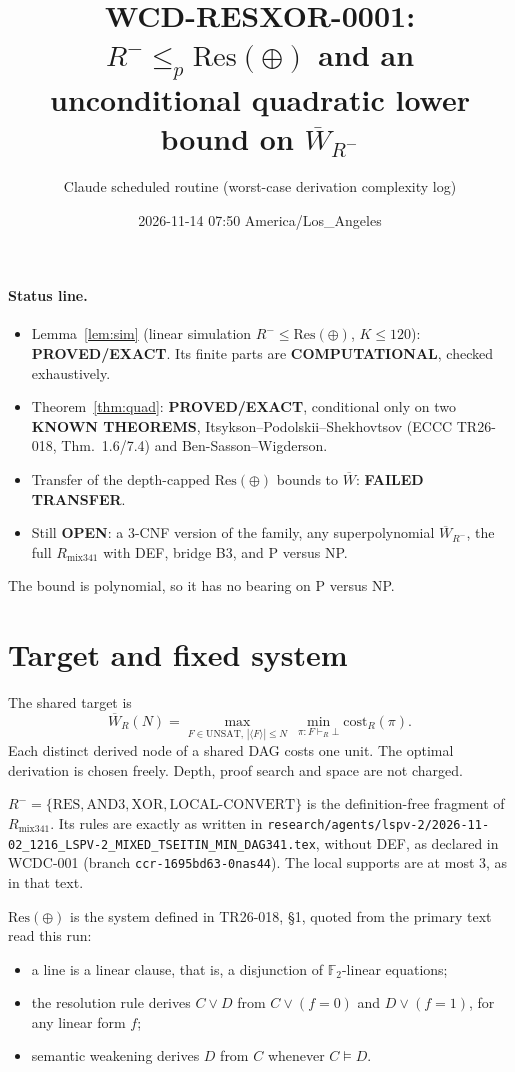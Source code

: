 \documentclass[11pt]{article}
\title{WCD-RESXOR-0001: $R^-\le_p\mathrm{Res}(\oplus)$ and an unconditional quadratic lower bound on $\overline W_{R^-}$}
\author{Claude scheduled routine (worst-case derivation complexity log)}
\date{2026-11-14 07:50 America/Los\_Angeles}
\begin{document}
\maketitle

\paragraph{Status line.}
\begin{itemize}
\item Lemma~\ref{lem:sim} (linear simulation $R^-\le\mathrm{Res}(\oplus)$, $K\le120$): \textbf{PROVED/EXACT}. Its finite parts are \textbf{COMPUTATIONAL}, checked exhaustively.
\item Theorem~\ref{thm:quad}: \textbf{PROVED/EXACT}, conditional only on two \textbf{KNOWN THEOREMS}, Itsykson--Podolskii--Shekhovtsov (ECCC TR26-018, Thm.~1.6/7.4) and Ben-Sasson--Wigderson.
\item Transfer of the depth-capped $\mathrm{Res}(\oplus)$ bounds to $\overline W$: \textbf{FAILED TRANSFER}.
\item Still \textbf{OPEN}: a 3-CNF version of the family, any superpolynomial $\overline W_{R^-}$, the full $R_{\mathrm{mix341}}$ with DEF, bridge B3, and P versus NP.
\end{itemize}
The bound is polynomial, so it has no bearing on P versus NP.

\section{Target and fixed system}
The shared target is
\[\overline W_R(N)=\max_{F\in\mathrm{UNSAT},\,|\langle F\rangle|\le N}\ \min_{\pi:F\vdash_R\bot}\mathrm{cost}_R(\pi).\]
Each distinct derived node of a shared DAG costs one unit. The optimal derivation is chosen freely. Depth, proof search and space are not charged.

$R^-=\{\mathrm{RES},\mathrm{AND3},\mathrm{XOR},\mathrm{LOCAL\text{-}CONVERT}\}$ is the definition-free fragment of $R_{\mathrm{mix341}}$. Its rules are exactly as written in \texttt{research/agents/lspv-2/2026-11-02\_1216\_LSPV-2\_MIXED\_TSEITIN\_MIN\_DAG341.tex}, without DEF, as declared in WCDC-001 (branch \texttt{ccr-1695bd63-0nas44}). The local supports are at most 3, as in that text.

$\mathrm{Res}(\oplus)$ is the system defined in TR26-018, \S1, quoted from the primary text read this run:
\begin{itemize}
\item a line is a linear clause, that is, a disjunction of $\mathbb F_2$-linear equations;
\item the resolution rule derives $C\vee D$ from $C\vee(f=0)$ and $D\vee(f=1)$, for any linear form $f$;
\item semantic weakening derives $D$ from $C$ whenever $C\models D$.
\end{itemize}
\end{document}
